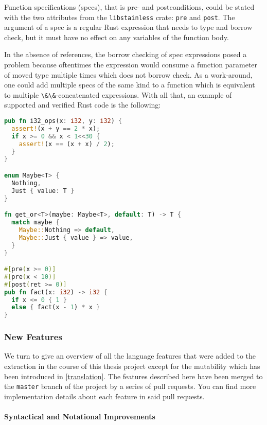 Function specifications (specs), that is pre- and postconditions, could
be stated with the two attributes from the
\passthrough{\lstinline!libstainless!} crate:
\passthrough{\lstinline!pre!} and \passthrough{\lstinline!post!}. The
argument of a spec is a regular Rust expression that needs to type and
borrow check, but it must have no effect on any variables of the
function body.

In the absence of references, the borrow checking of spec expressions
posed a problem because oftentimes the expression would consume a
function parameter of moved type multiple times which does not borrow
check. As a work-around, one could add multiple specs of the same kind
to a function which is equivalent to multiple
\passthrough{\lstinline!\&\&!}-concatenated expressions. With all that,
an example of supported and verified Rust code is the following:

\begin{lstlisting}[language=Rust]
pub fn i32_ops(x: i32, y: i32) {
  assert!(x + y == 2 * x);
  if x >= 0 && x < 1<<30 {
    assert!(x == (x + x) / 2);
  }
}

enum Maybe<T> {
  Nothing,
  Just { value: T }
}

fn get_or<T>(maybe: Maybe<T>, default: T) -> T {
  match maybe {
    Maybe::Nothing => default,
    Maybe::Just { value } => value,
  }
}

#[pre(x >= 0)]
#[pre(x < 10)]
#[post(ret >= 0)]
pub fn fact(x: i32) -> i32 {
  if x <= 0 { 1 }
  else { fact(x - 1) * x }
}
\end{lstlisting}

\subsubsection{New Features}

We turn to give an overview of all the language features that were added
to the extraction in the course of this thesis project except for the
mutability which has been introduced in \autoref{translation}. The
features described here have been merged to the
\passthrough{\lstinline!master!} branch of the project by a series of
pull requests. You can find more implementation details about each
feature in said pull requests.

\paragraph{Syntactical and Notational Improvements}

